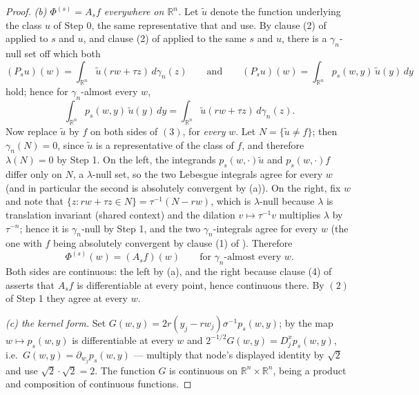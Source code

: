 \begin{proof}
\emph{(b) $\Phi^{(s)} = A_sf$ everywhere on $\mathbb{R}^n$.}
Let $\tilde u$ denote the function underlying the class $u$ of Step 0, the same
representative that  and 
use.  By clause (2) of  applied to $s$ and $u$, and
clause (2) of  applied to the same $s$ and $u$,
there is a $\gamma_n$-null set off which both
\[
  (P_su)(w) = \int_{\mathbb{R}^n}\tilde u(rw+\tau z)\,d\gamma_n(z)
  \qquad\text{and}\qquad
  (P_su)(w) = \int_{\mathbb{R}^n}p_s(w,y)\,\tilde u(y)\,dy
\]
hold; hence for $\gamma_n$-almost every $w$,
\begin{equation*}
  \int_{\mathbb{R}^n}p_s(w,y)\,\tilde u(y)\,dy
    = \int_{\mathbb{R}^n}\tilde u(rw+\tau z)\,d\gamma_n(z) . \tag{3}
\end{equation*}
Now replace $\tilde u$ by $f$ on both sides of $(3)$, for \emph{every} $w$.  Let
$N = \{\tilde u \neq f\}$; then $\gamma_n(N) = 0$, since $\tilde u$ is a
representative of the class of $f$, and therefore $\lambda(N) = 0$ by Step 1.
On the left, the integrands $p_s(w,\cdot)\tilde u$ and $p_s(w,\cdot)f$ differ
only on $N$, a $\lambda$-null set, so the two Lebesgue integrals agree for every
$w$ (and in particular the second is absolutely convergent by (a)).  On the
right, fix $w$ and note that
$\{z : rw+\tau z \in N\} = \tau^{-1}(N - rw)$, which is $\lambda$-null because
$\lambda$ is translation invariant (shared context) and the dilation
$v \mapsto \tau^{-1}v$ multiplies $\lambda$ by $\tau^{-n}$; hence it is
$\gamma_n$-null by Step 1, and the two $\gamma_n$-integrals agree for every $w$
(the one with $f$ being absolutely convergent by clause (1) of
).  Therefore
\[
  \Phi^{(s)}(w) = (A_sf)(w) \qquad\text{for } \gamma_n\text{-almost every } w .
\]
Both sides are continuous: the left by (a), and the right because clause (4) of
 asserts that $A_sf$ is differentiable at
every point, hence continuous there.  By $(2)$ of Step 1 they agree at every
$w$.

\emph{(c) the kernel form.}  Set
$G(w,y) = 2r(y_j-rw_j)\sigma^{-1}p_s(w,y)$; by
 the map $w \mapsto p_s(w,y)$ is differentiable
at every $w$ and $2^{-1/2}G(w,y) = D_j^xp_s(w,y)$, i.e.\
$G(w,y) = \partial_{w_j}p_s(w,y)$ --- multiply that node's displayed identity by
$\sqrt2$ and use $\sqrt2\cdot\sqrt2 = 2$.  The function $G$ is continuous on
$\mathbb{R}^n\times\mathbb{R}^n$, being a product and composition of continuous
functions.


\end{proof}
